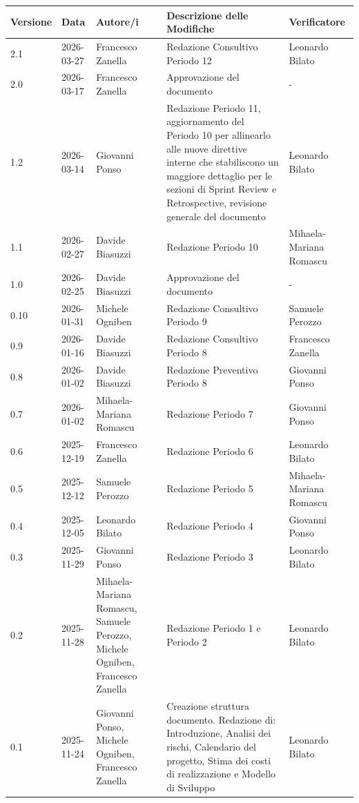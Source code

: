 \documentclass[a4paper, 11pt, oneside]{scrartcl} %
\begin{document}
\begin{center}
\renewcommand{\arraystretch}{1.2}
\begin{tabularx}{\textwidth}{@{}p{}p{}p{}X>{\centering\arraybackslash}p{}@{}}
\toprule
\textbf{Versione} & \textbf{Data} & \textbf{Autore/i} & \textbf{Descrizione delle Modifiche} & \textbf{Verificatore} \\
\midrule
2.1 & 2026-03-27 & Francesco Zanella & Redazione Consultivo Periodo 12 & Leonardo Bilato \\
2.0 & 2026-03-17 & Francesco Zanella & Approvazione del documento & - \\
1.2 & 2026-03-14 & Giovanni Ponso & Redazione Periodo 11, aggiornamento del Periodo 10 per allinearlo alle nuove direttive interne che stabiliscono un maggiore dettaglio per le sezioni di Sprint Review e Retrospective, revisione generale del documento & Leonardo Bilato \\
1.1 & 2026-02-27 & Davide Biasuzzi & Redazione Periodo 10 & Mihaela-Mariana Romascu \\
1.0 & 2026-02-25 & Davide Biasuzzi & Approvazione del documento & - \\
0.10 & 2026-01-31 & Michele Ogniben & Redazione Consultivo Periodo 9 & Samuele Perozzo \\
0.9 & 2026-01-16 & Davide Biasuzzi & Redazione Consultivo Periodo 8 & Francesco Zanella \\
0.8 & 2026-01-02 & Davide Biasuzzi & Redazione Preventivo Periodo 8 & Giovanni Ponso \\
0.7 & 2026-01-02 & Mihaela-Mariana Romascu & Redazione Periodo 7 & Giovanni Ponso \\
0.6 & 2025-12-19 & Francesco Zanella & Redazione Periodo 6 & Leonardo Bilato \\
0.5 & 2025-12-12 & Samuele Perozzo & Redazione Periodo 5 & Mihaela-Mariana Romascu \\
0.4 & 2025-12-05 & Leonardo Bilato & Redazione Periodo 4 & Giovanni Ponso \\
0.3 & 2025-11-29 & Giovanni Ponso & Redazione Periodo 3 & Leonardo Bilato \\
0.2 & 2025-11-28 & Mihaela-Mariana Romascu, Samuele Perozzo, Michele Ogniben, Francesco Zanella & Redazione Periodo 1 e Periodo 2 & Leonardo Bilato \\
0.1 & 2025-11-24 & Giovanni Ponso, Michele Ogniben, Francesco Zanella & Creazione struttura documento. Redazione di: Introduzione, Analisi dei rischi, Calendario del progetto, Stima dei costi di realizzazione e Modello di Sviluppo & Leonardo Bilato \\
\bottomrule
\end{tabularx}
\end{center}
\end{document}
